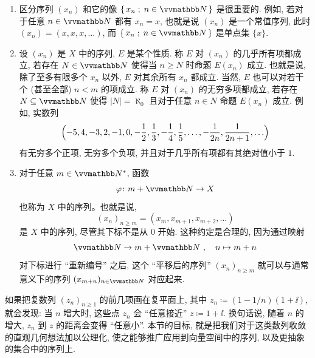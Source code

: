 \begin{remark}
    \begin{enumerate}
        \item 区分序列 \((x_n)\) 和它的像 \(\{\, x_n \;;\; n \in \N \,\}\) 是很重要的. 例如, 若对于任意 \(n \in \N\) 都有 \(x_n = x\), 也就是说 \((x_n)\) 是一个常值序列, 此时 \((x_n) = (x, x, x, \ldots)\), 而 \(\{\, x_n \;;\; n \in \N \,\}\) 是单点集 \(\{x\}\).
        \item 设 \((x_n)\) 是 \(X\) 中的序列, \(E\) 是某个性质. 称 \(E\) 对 \((x_n)\) 的几乎所有项都成立, 若存在 \(N \in \N\) 使得当 \(n \geq N\) 时命题 \(E(x_n)\) 成立. 也就是说, 除了至多有限多个 \(x_n\) 以外, \(E\) 对其余所有 \(x_n\) 都成立. 当然, \(E\) 也可以对若干个 (甚至全部) \(n < m\) 的项成立. 称 \(E\) 对 \((x_n)\) 的无穷多项都成立, 若存在 \(N \subseteq \N\) 使得 \(|N| = \aleph_0\) 且对于任意 \(n \in N\) 命题 \(E(x_n)\) 成立. 例如, 实数列
        \[
            \Bigl(- 5, 4, - 3, 2, - 1, 0, - \frac{1}{2}, \frac{1}{3}, - \frac{1}{4}, \frac{1}{5}, \ldots, - \frac{1}{2 n}, \frac{1}{2 n + 1}, \ldots\Bigr)
        \]
        有无穷多个正项, 无穷多个负项, 并且对于几乎所有项都有其绝对值小于 \(1\).
        \item 对于任意 \(m \in \N^\ast\), 函数
        \[
            \varphi \colon m + \N \to X
        \]
        也称为 \(X\) 中的序列。也就是说,
        \[
            (x_n)_{n \geq m} = (x_m, x_{m + 1}, x_{m + 2}, \ldots)
        \]
        是 \(X\) 中的序列, 尽管其下标不是从 \(0\) 开始. 这种约定是合理的, 因为通过映射
        \[
            \N \to m + \N\ ,\quad n \mapsto m + n
        \]
        对下标进行 ``重新编号'' 之后, 这个 ``平移后的序列'' \((x_n)_{n \geq m}\) 就可以与通常意义下的序列 \((x_{m + n})_{n \in \N}\) 对应起来.
    \end{enumerate}
\end{remark}

如果把复数列 \((z_n)_{n \geq 1}\) 的前几项画在复平面上, 其中 \(z_n \coloneqq (1 - 1 / n)(1 + \ii)\), 就会发现: 当 \(n\) 增大时, 这些点 \(z_n\) 会 ``任意接近'' \(z \coloneqq 1 + \ii\). 换句话说, 随着 \(n\) 的增大, \(z_n\) 到 \(z\) 的距离会变得 ``任意小''. 本节的目标, 就是把我们对于这类数列收敛的直观几何想法加以公理化, 使之能够推广应用到向量空间中的序列, 以及更抽象的集合中的序列上.

\begin{center}
\end{center}

